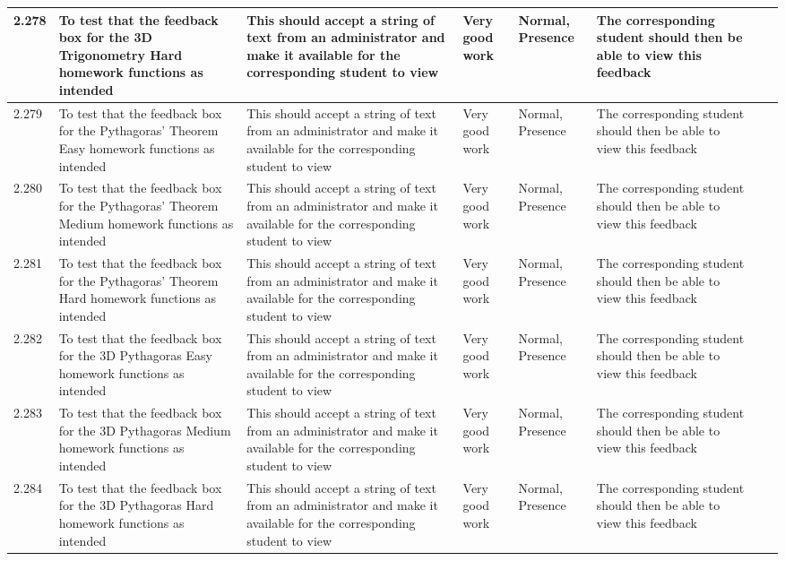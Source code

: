 \begin{landscape}
\begin{center}
\begin{longtable}{|p{1.5cm}|p{2.5cm}|p{2.5cm}|p{2cm}|p{2cm}|p{2cm}|p{2cm}|p{2cm}|}
2.278 & To test that the feedback box for the 3D Trigonometry Hard homework functions as intended & This should accept a string of text from an administrator and make it available for the corresponding student to view & Very good work & Normal, Presence & The corresponding student should then be able to view this feedback & & \\ \hline
2.279 & To test that the feedback box for the Pythagoras' Theorem Easy homework functions as intended & This should accept a string of text from an administrator and make it available for the corresponding student to view & Very good work & Normal, Presence & The corresponding student should then be able to view this feedback & & \\ \hline
2.280 & To test that the feedback box for the Pythagoras' Theorem Medium homework functions as intended & This should accept a string of text from an administrator and make it available for the corresponding student to view & Very good work & Normal, Presence & The corresponding student should then be able to view this feedback & & \\ \hline
2.281 & To test that the feedback box for the Pythagoras' Theorem Hard homework functions as intended & This should accept a string of text from an administrator and make it available for the corresponding student to view & Very good work & Normal, Presence & The corresponding student should then be able to view this feedback & & \\ \hline
2.282 & To test that the feedback box for the 3D Pythagoras Easy homework functions as intended & This should accept a string of text from an administrator and make it available for the corresponding student to view & Very good work & Normal, Presence & The corresponding student should then be able to view this feedback & & \\ \hline
2.283 & To test that the feedback box for the 3D Pythagoras Medium homework functions as intended & This should accept a string of text from an administrator and make it available for the corresponding student to view & Very good work & Normal, Presence & The corresponding student should then be able to view this feedback & & \\ \hline
2.284 & To test that the feedback box for the 3D Pythagoras Hard homework functions as intended & This should accept a string of text from an administrator and make it available for the corresponding student to view & Very good work & Normal, Presence & The corresponding student should then be able to view this feedback & & \\ \hline

\end{longtable}
\end{center}
\end{landscape}
